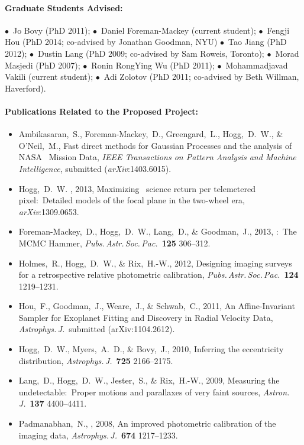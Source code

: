 \documentclass[letterpaper,12pt]{article}
\begin{document}
\paragraph{Graduate Students Advised:}
$\bullet$~Jo Bovy (PhD 2011);
$\bullet$~Daniel Foreman-Mackey (current student);
$\bullet$~Fengji Hou (PhD 2014; co-advised by Jonathan Goodman, NYU)
$\bullet$~Tao Jiang (PhD 2012);
$\bullet$~Dustin Lang (PhD 2009; co-advised by Sam Roweis, Toronto);
$\bullet$~Morad Masjedi (PhD 2007);
$\bullet$~Ronin RongYing Wu (PhD 2011);
$\bullet$~Mohammadjavad Vakili (current student);
$\bullet$~Adi Zolotov (PhD 2011; co-advised by Beth Willman, Haverford).

\paragraph{Publications Related to the Proposed Project:}
\begin{itemize}\setlength{\itemsep}{0pt}
\item
Ambikasaran,~S., Foreman-Mackey,~D., Greengard,~L., Hogg,~D.~W., \& O'Neil,~M.,
{Fast direct methods for Gaussian Processes and the analysis of NASA \Kepler\ Mission Data},
\textit{IEEE Transactions on Pattern Analysis and Machine Intelligence}, submitted (\textit{arXiv}:{1403.6015}).
\item
Hogg,~D.~W. \etal, 2013,
{Maximizing \Kepler\ science return per telemetered pixel:\ Detailed models of the focal plane in the two-wheel era},
\textit{arXiv}:{1309.0653}.
\item
Foreman-Mackey,~D., Hogg,~D.~W., Lang,~D., \& Goodman,~J., 2013,
{:\ The MCMC Hammer},
\textit{Pubs.\,Astr.\,Soc.\,Pac.}\ \textbf{125} 306--312.
\item
Holmes,~R., Hogg,~D.~W., \& Rix,~H.-W., 2012,
{Designing imaging surveys for a retrospective relative photometric calibration},
\textit{Pubs.\,Astr.\,Soc.\,Pac.}\ \textbf{124} 1219--1231.
\item
Hou,~F., Goodman,~J., Weare,~J., \& Schwab,~C., 2011, An
Affine-Invariant Sampler for Exoplanet Fitting and Discovery in Radial
Velocity Data, \textit{Astrophys.\,J.}\ submitted (arXiv:1104.2612).
\item
Hogg,~D.~W., Myers,~A.~D., \& Bovy,~J., 2010, Inferring the
eccentricity distribution, \textit{Astrophys.\,J.}\ \textbf{725}
2166--2175.
\item
Lang,~D., Hogg,~D.~W., Jester,~S., \& Rix,~H.-W., 2009, Measuring the
undetectable:\ Proper motions and parallaxes of very faint sources,
\textit{Astron.\,J.}\ \textbf{137} 4400--4411.
\item
Padmanabhan,~N., \etal, 2008,
{An improved photometric calibration of the  imaging data},
\textit{Astrophys.\,J.}\ \textbf{674} 1217--1233.
\end{itemize}
\end{document}
